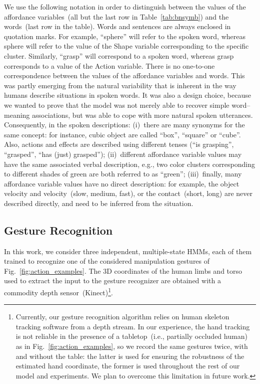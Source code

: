 We use the following notation in order to distinguish between the values of the affordance variables~(all but the last row in Table~\ref{tab:bnsymb}) and the words~(last row in the table).
Words and sentences are always enclosed in quotation marks.
For example, ``sphere'' will refer to the spoken word, whereas sphere will refer to the value of the Shape variable corresponding to the specific cluster.
Similarly, ``grasp'' will correspond to a spoken word, whereas grasp corresponds to a value of the Action variable.
There is no one-to-one correspondence between the values of the affordance variables and words.
This was partly emerging from the natural variability that is inherent in the way humans describe situations in spoken words.
It was also a design choice, because we wanted to prove that the model was not merely able to recover simple word--meaning associations, but was able to cope with more natural spoken utterances.
Consequently, in the spoken descriptions:
(i)~there are many synonyms for the same concept: for instance, cubic object are called ``box'', ``square'' or ``cube''. Also, actions and effects are described using different tenses (``is grasping'', ``grasped'', ``has (just) grasped'');
(ii)~different affordance variable values may have the same associated verbal description, e.g., two color clusters corresponding to different shades of green are both referred to as ``green'';
(iii)~finally, many affordance variable values have no direct description: for example, the object velocity and \objecthand{} velocity~(slow, medium, fast), or the \objecthand{} contact~(short, long) are never described directly, and need to be inferred from the situation.

\subsection{Gesture Recognition}
\label{sec:experimental_settings:gesture_recognition}
In this work, we consider three independent, multiple-state \aclp{HMM}, each of them trained to recognize one of the considered manipulation gestures of  Fig.~\ref{fig:action_examples}.
The 3D coordinates of the human limbs and torso used to extract the input to the gesture recognizer are obtained with a commodity depth sensor~(Kinect)\footnote{Currently, our gesture recognition algorithm relies on human skeleton tracking software from a depth stream.
In our experience, the hand tracking is not reliable in the presence of a tabletop~(i.e., partially occluded human) as in Fig.~\ref{fig:action_examples}, so we record the same gestures twice, with and without the table: the latter is used for ensuring the robustness of the estimated hand coordinate, the former is used throughout the rest of our model and experiments.
We plan to overcome this limitation in future work.}.
